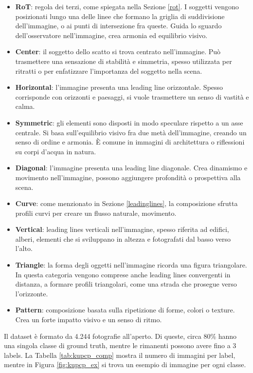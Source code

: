 \begin{itemize}
    \item \textbf{RoT}: regola dei terzi, come spiegata nella Sezione \ref{rot}. I soggetti vengono posizionati lungo una delle linee che formano la griglia di suddivisione dell'immagine, o ai punti di intersezione fra queste. Guida lo sguardo dell'osservatore nell'immagine, crea armonia ed equilibrio visivo.
    \item \textbf{Center}: il soggetto dello scatto si trova centrato nell'immagine. Può trasmettere una sensazione di stabilità e simmetria, spesso utilizzata per ritratti o per enfatizzare l'importanza del soggetto nella scena.
    \item \textbf{Horizontal}: l'immagine presenta una leading line orizzontale. Spesso corrisponde con orizzonti e paesaggi, si vuole trasmettere un senso di vastità e calma.
    \item \textbf{Symmetric}: gli elementi sono disposti in modo speculare rispetto a un asse centrale. Si basa sull'equilibrio visivo fra due metà dell'immagine, creando un senso di ordine e armonia. È comune in immagini di architettura o riflessioni su corpi d'acqua in natura.
    \item \textbf{Diagonal}: l'immagine presenta una leading line diagonale. Crea dinamismo e movimento nell'immagine, possono aggiungere profondità o prospettiva alla scena.
    \item \textbf{Curve}: come menzionato in Sezione \ref{leadinglines}, la composizione sfrutta profili curvi per creare un flusso naturale, movimento.
    \item \textbf{Vertical}: leading lines verticali nell'immagine, spesso riferita ad edifici, alberi, elementi che si sviluppano in altezza e fotografati dal basso verso l'alto.
    \item \textbf{Triangle}: la forma degli oggetti nell'immagine ricorda una figura triangolare. In questa categoria vengono comprese anche leading lines convergenti in distanza, a formare profili triangolari, come una strada che prosegue verso l'orizzonte.
    \item \textbf{Pattern}: composizione basata sulla ripetizione di forme, colori o texture. Crea un forte impatto visivo e un senso di ritmo.
\end{itemize}

Il dataset è formato da 4.244 fotografie all'aperto. Di queste, circa 80\% hanno una singola classe di ground truth, mentre le rimanenti possono avere fino a 3 labels. La Tabella \ref{tab:kupcp_comp} mostra il numero di immagini per label, mentre in Figura \ref{fig:kupcp_ex} si trova un esempio di immagine per ogni classe. 

